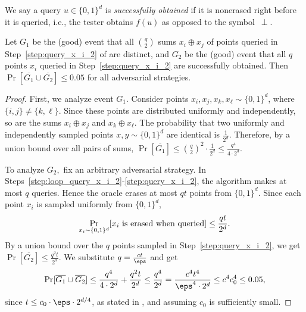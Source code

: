 \documentclass{toc}
\begin{document}
We say a query $u \in \{0,1\}^d$ is {\em successfully obtained} if it is nonerased right before it is queried, i.e., the tester obtains $f(u)$ as opposed to the symbol~$\perp$.

\begin{lemma}\label{lem:distinct-and-nonerased}
%
Let $G_1$ be the (good) event that all $\binom{q}{2}$ sums $x_i \oplus x_j$ of points queried in Step~\ref{step:query_x_i_2} of  are distinct, and $G_2$ be the (good) event that all $q$ points $x_i$ queried in Step~\ref{step:query_x_i_2} are successfully obtained. Then $\Pr[\overline{G_1} \cup \overline{G_2}] \le 0.05$ for all adversarial strategies.
\end{lemma}
\begin{proof}
First, we analyze event $G_1$. Consider points $x_i, x_j, x_k, x_\ell \sim \{0,1\}^d$,  where $\{i,j\} \neq \{k, \ell\}$.  Since these points are distributed uniformly and independently, so are the sums $x_i \oplus x_j$ and $x_k \oplus x_\ell$. The probability that two uniformly and independently sampled points $x,y \sim \{0,1\}^d$ are identical is  $\frac{1}{2^d}$. Therefore, by a union bound over all pairs of sums, $\Pr[\overline{G_1}] \leq \binom{q}{2}^2 \cdot \frac{1}{2^d} \leq \frac{q^4}{4\cdot 2^d}.$ 

To analyze $G_2,$ fix an arbitrary adversarial strategy.
In Steps~\ref{step:loop_query_x_i_2}-\ref{step:query_x_i_2}, the algorithm makes at most $q$ queries. Hence the oracle erases at most $qt$ points from $\{0,1\}^d$. Since each point $x_i$ is sampled uniformly from $\{0,1\}^d$,
\begin{equation*}
    \Pr_{x_i \sim \{0,1\}^d} [x_i \textnormal{ is erased when queried}] \leq \frac{qt}{ 2^d}.
\end{equation*}
By a union bound over the $q$ points sampled in Step~\ref{step:query_x_i_2}, we get $\Pr[\overline{G_2}] \leq \frac{q^2t}{2^d}$. We substitute $q = \frac{ct}{\eps}$ and get
\begin{align*}
     \Pr[\overline{G_1} \cup \overline{G_2}] \leq \frac{q^4}{4 \cdot 2^d} + \frac{q^2t}{2^d} \leq \frac{q^4}{2^d} = \frac{c^4 t^4}{\eps^4 \cdot 2^d} \leq  c^4c_0^4 \leq 0.05,
\end{align*}
since $t \leq c_0\cdot\eps \cdot  2^{d/4}$, as stated in , and assuming $c_0$ is sufficiently small.
\end{proof}
\end{document}
